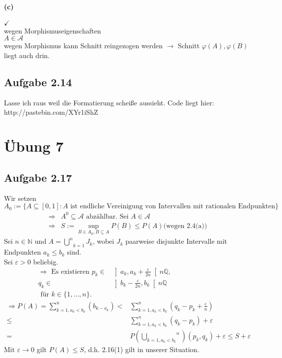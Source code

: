 \documentclass[10pt, a4paper]{article}
\begin{document}
\paragraph*{(c)}
$\checkmark$	\\
wegen Morphismuseigenschaften	\\
$A\in\mathcal{A}$	\\
wegen Morphismus kann Schnitt reingezogen werden $\rightarrow$ Schnitt $\varphi(A), \varphi(B)$ liegt auch drin.


\subsection{Aufgabe 2.14}
Lasse ich raus weil die Formatierung scheiße aussieht. Code liegt hier: http://pastebin.com/XYr1iShZ


\section{Übung 7}
\subsection{Aufgabe 2.17}
Wir setzen $A_{0}:=\{A\subseteq [0,1]:A\text{ ist endliche Vereinigung von Intervallen mit rationalen Endpunkten} \}$
\begin{align*}
	\Rightarrow& A^{0}\subseteq\mathcal{A}\text{ abzählbar. Sei }A\in\mathcal{A}	\\
	\Rightarrow& S:=\underset{B\in A_{0}, B\subseteq A}{\sup} P(B)\leq P(A) \text{(wegen 2.4(a))}
\end{align*}
Sei $n\in\mathbb{N}$ und $A=\underset{k=1}{\stackrel{n}{\bigcup}}J_{k}$, wobei $J_{k}$ paarweise disjunkte Intervalle mit Endpunkten $a_{k}\leq b_{k}$ sind.	\\
Sei $\varepsilon>0$ beliebig.
\begin{align*}
	\Rightarrow\text{ Es existieren }p_{k}\in& \left] a_{k}, a_{k}+\frac{\varepsilon}{2n} \right[ n\mathbb{Q},\hspace{80pt}	\\
	q_{k}\in& \left] b_{k}-\frac{\varepsilon}{2n}, b_{k}\right[ n\mathbb{Q}	\\
	\text{ für } k\in\{1,\dots,n\}.&
\end{align*}
\begin{align*}
	\Rightarrow P(A)=\sum_{k=1,a_{k}<b_{k}}^{n}(b_{k-a_{k}}) <& \sum_{k=1,a_{k}<b_{k}}^{n}(q_{k}-p_{k}+\frac{\varepsilon}{n})	\\
	\leq& \sum_{k=1,a_{k}<b_{k}}^{n}(q_{k}-p_{k})+\varepsilon	\\
	=&P(\stackrel{n}{\underset{k=1,a_{k}<b_{k}}{\bigcup}})(p_{k},q_{k})+\varepsilon\leq S+\varepsilon
\end{align*}
Mit $\varepsilon\rightarrow0$ gilt $P(A)\leq S$, d.h. 2.16(1) gilt in unserer Situation.
\end{document}
